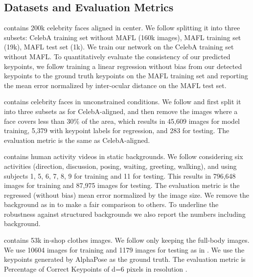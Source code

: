 \documentclass{article}
\begin{document}
\subsection{Datasets and Evaluation Metrics} \label{sec:datasets}
\noindent{} \cite{liu2015faceattributes} contains 200k celebrity faces aligned in center. We follow \cite{thewlis2017unsupervised} splitting it into three subsets: CelebA training set without MAFL (160k images), MAFL training set (19k), MAFL test set (1k). We train our network on the CelebA training set without MAFL. To quantitatively evaluate the consistency of our predicted keypoints, we follow \cite{thewlis2017unsupervised} training a linear regression without bias from our detected keypoints to the ground truth keypoints on the MAFL training set and reporting the mean  error normalized by inter-ocular distance on the MAFL test set.

\noindent{} \cite{liu2015faceattributes} contains celebrity faces in unconstrained conditions. We follow \cite{hung2019scops} and first split it into three subsets as for CelebA-aligned, and then remove the images where a face covers less than 30\% of the area, which results in 45,609 images for model training, 5,379 with keypoint labels for regression, and 283 for testing. The evaluation metric is the same as CelebA-aligned.

\noindent{} \cite{Ionescu2014human36m} contains human activity videos in static backgrounds. We follow \cite{zhang2018unsupervised} considering six activities (direction, discussion, posing, waiting, greeting, walking), and using subjects 1, 5, 6, 7, 8, 9 for training and 11 for testing. This results in 796,648 images for training and 87,975 images for testing. The evaluation metric is the regressed (without bias) mean  error normalized by the image size. We remove the background as in \cite{zhang2018unsupervised, lorenz2019unsupervised} to make a fair comparison to others.
To underline the robustness against structured backgrounds we also report the numbers including background.

\noindent{} \cite{liu2016deepfashion} contains 53k in-shop clothes images. We follow \cite{lorenz2019unsupervised} only keeping the full-body images. We use 10604 images for training and 1179 images for testing as in \cite{sandro2020unsupervised}. We use the keypoints generated by AlphaPose \cite{fang2017rmpe} as the ground truth. The evaluation metric is Percentage of Correct Keypoints of d=6 pixels in resolution .
\end{document}
